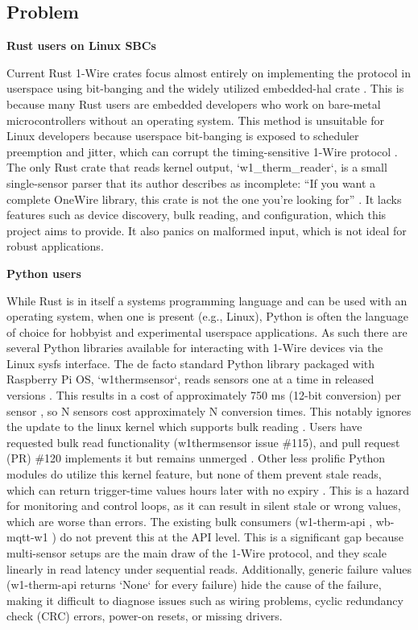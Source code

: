 \documentclass[conference]{IEEEtran}
\begin{document}
\subsection{Problem}

\textbf{Rust users on Linux SBCs}

Current Rust 1-Wire crates focus almost entirely on implementing the protocol in userspace using bit-banging and the widely utilized embedded-hal crate \cite{fuchsnj_one_wire_bus, fuchsnj_ds18b20}. 
This is because many Rust users are embedded developers who work on bare-metal microcontrollers \cite{state_of_rust_embedded_2026} without an operating system. 
This method is unsuitable for Linux developers because userspace bit-banging is exposed to scheduler preemption and jitter, which can corrupt the timing-sensitive 1-Wire protocol \cite{adam2021performance}. 
The only Rust crate that reads kernel output, `w1\_therm\_reader`, is a small single-sensor parser that its author describes as incomplete: ``If you want a complete OneWire library, this crate is not the one you're looking for'' \cite{w1_therm_reader}.
It lacks features such as device discovery, bulk reading, and configuration, which this project aims to provide.
It also panics on malformed input, which is not ideal for robust applications.

\textbf{Python users}

While Rust is in itself a systems programming language and can be used with an operating system, when one is present (e.g., Linux), Python is often the language of choice for hobbyist and experimental userspace applications. 
As such there are several Python libraries available for interacting with 1-Wire devices via the Linux sysfs interface. 
The de facto standard Python library packaged with Raspberry Pi OS, `w1thermsensor`, reads sensors one at a time in released versions \cite{w1thermsensor}. 
This results in a cost of approximately 750 ms (12-bit conversion) per sensor \cite{ds18b20_datasheet}, so N sensors cost approximately N conversion times. 
This notably ignores the update to the linux kernel which supports bulk reading \cite{kernel_w1_therm_docs}. 
Users have requested bulk read functionality (w1thermsensor issue \#115), and pull request (PR) \#120 implements it but remains unmerged \cite{w1thermsensor_pr120}. 
Other less prolific Python modules do utilize this kernel feature, but none of them prevent stale reads, which can return trigger-time values hours later with no expiry \cite{kernel_w1_therm_abi}. 
This is a hazard for monitoring and control loops, as it can result in silent stale or wrong values, which are worse than errors. 
The existing bulk consumers (w1-therm-api \cite{w1_therm_api}, wb-mqtt-w1 \cite{wb_mqtt_w1}) do not prevent this at the API level. 
This is a significant gap because multi-sensor setups are the main draw of the 1-Wire protocol, and they scale linearly in read latency under sequential reads. 
Additionally, generic failure values (w1-therm-api returns `None` for every failure) hide the cause of the failure, making it difficult to diagnose issues such as wiring problems, cyclic redundancy check (CRC) errors, power-on resets, or missing drivers.
\end{document}
